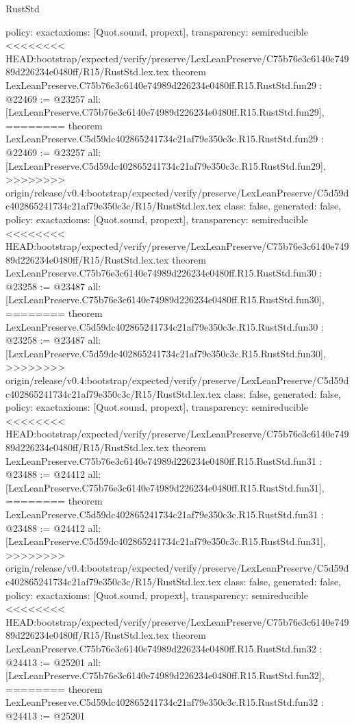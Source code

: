 \begin{lexlean}{RustStd}
\begin{coremodule}
{\begin{coremodule}
{{{{{{{{{{{{{{{{{{{{{{{{{{{{{{{{  policy: exact{axioms: [Quot.sound, propext]},
  transparency: semireducible
}
<<<<<<<< HEAD:bootstrap/expected/verify/preserve/LexLeanPreserve/C75b76e3c6140e74989d226234e0480ff/R15/RustStd.lex.tex
theorem LexLeanPreserve.C75b76e3c6140e74989d226234e0480ff.R15.RustStd.fun29 : @22469 := @23257 {
  all: [LexLeanPreserve.C75b76e3c6140e74989d226234e0480ff.R15.RustStd.fun29],
========
theorem LexLeanPreserve.C5d59dc402865241734c21af79e350c3c.R15.RustStd.fun29 : @22469 := @23257 {
  all: [LexLeanPreserve.C5d59dc402865241734c21af79e350c3c.R15.RustStd.fun29],
>>>>>>>> origin/release/v0.4:bootstrap/expected/verify/preserve/LexLeanPreserve/C5d59dc402865241734c21af79e350c3c/R15/RustStd.lex.tex
  class: false,
  generated: false,
  policy: exact{axioms: [Quot.sound, propext]},
  transparency: semireducible
}
<<<<<<<< HEAD:bootstrap/expected/verify/preserve/LexLeanPreserve/C75b76e3c6140e74989d226234e0480ff/R15/RustStd.lex.tex
theorem LexLeanPreserve.C75b76e3c6140e74989d226234e0480ff.R15.RustStd.fun30 : @23258 := @23487 {
  all: [LexLeanPreserve.C75b76e3c6140e74989d226234e0480ff.R15.RustStd.fun30],
========
theorem LexLeanPreserve.C5d59dc402865241734c21af79e350c3c.R15.RustStd.fun30 : @23258 := @23487 {
  all: [LexLeanPreserve.C5d59dc402865241734c21af79e350c3c.R15.RustStd.fun30],
>>>>>>>> origin/release/v0.4:bootstrap/expected/verify/preserve/LexLeanPreserve/C5d59dc402865241734c21af79e350c3c/R15/RustStd.lex.tex
  class: false,
  generated: false,
  policy: exact{axioms: [Quot.sound, propext]},
  transparency: semireducible
}
<<<<<<<< HEAD:bootstrap/expected/verify/preserve/LexLeanPreserve/C75b76e3c6140e74989d226234e0480ff/R15/RustStd.lex.tex
theorem LexLeanPreserve.C75b76e3c6140e74989d226234e0480ff.R15.RustStd.fun31 : @23488 := @24412 {
  all: [LexLeanPreserve.C75b76e3c6140e74989d226234e0480ff.R15.RustStd.fun31],
========
theorem LexLeanPreserve.C5d59dc402865241734c21af79e350c3c.R15.RustStd.fun31 : @23488 := @24412 {
  all: [LexLeanPreserve.C5d59dc402865241734c21af79e350c3c.R15.RustStd.fun31],
>>>>>>>> origin/release/v0.4:bootstrap/expected/verify/preserve/LexLeanPreserve/C5d59dc402865241734c21af79e350c3c/R15/RustStd.lex.tex
  class: false,
  generated: false,
  policy: exact{axioms: [Quot.sound, propext]},
  transparency: semireducible
}
<<<<<<<< HEAD:bootstrap/expected/verify/preserve/LexLeanPreserve/C75b76e3c6140e74989d226234e0480ff/R15/RustStd.lex.tex
theorem LexLeanPreserve.C75b76e3c6140e74989d226234e0480ff.R15.RustStd.fun32 : @24413 := @25201 {
  all: [LexLeanPreserve.C75b76e3c6140e74989d226234e0480ff.R15.RustStd.fun32],
========
theorem LexLeanPreserve.C5d59dc402865241734c21af79e350c3c.R15.RustStd.fun32 : @24413 := @25201 {
}}}}}}}}}}}}}}}}}}}}}}}}}}}}}}}}}}}}
\end{coremodule}}
\end{coremodule}
\end{lexlean}
